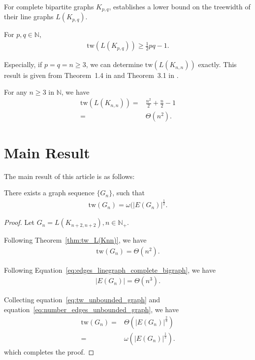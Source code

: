 \documentclass{article}
\newcommand{\edgesg}[1]{E(#1)}
\newcommand{\completebig}[2]{K_{#1,#2}}
\newcommand{\treewidth}{\mathrm{tw}}
\begin{document}
For complete bipartite graphs $\completebig{p}{q}$, \cite{HarveyWood2018} establishes a lower bound on the treewidth of their line graphs $L(\completebig{p}{q})$.

\begin{theorem}\label{thm:tw_lower_bound_of_L(Kpq)}
    For $p,q \in \mathbb{N}$, 
    \begin{align*}
        \mathrm{tw}(L(\completebig{p}{q})) \geq \frac{1}{2}pq-1.
    \end{align*}
\end{theorem}

Especially, if $p= q = n \geq 3$, we can determine $\mathrm{tw}(L(\completebig{n}{n}))$ exactly. This result is given from  Theorem~1.4 in \cite{harvey2014treewidth} and Theorem~3.1 in \cite{lucena2007achievable}. 

\begin{theorem}[Treewidth of $L(\completebig{n}{n})$]\label{thm:tw_L(Knn)}
For any $n \geq 3$ in $\mathbb{N}$, we have
\begin{align*}
    \treewidth(L(\completebig{n}{n})) =& \frac{n^2}{2} + \frac{n}{2} - 1 \\
    =& \Theta(n^2).
\end{align*}
\end{theorem}

\section{Main Result}
The main result of this article is as follows:
\begin{proposition}\label{pro:unbounded_graphs}
    There exists a graph sequence $\{G_n\}$, such that
    \begin{align*}
        \treewidth(G_n) = \omega(|\edgesg{G_n}|^{\frac{1}{2}}.
    \end{align*}
\end{proposition}
\begin{proof}
    Let $G_n = L(\completebig{n+2}{n+2}), n \in \mathbb{N}_+$.

    Following Theorem~\ref{thm:tw_L(Knn)}, we have
    \begin{align}\label{eq:tw_unbounded_graph}
        \treewidth(G_n) = \Theta(n^2).
    \end{align}

    Following Equation~\eqref{eq:edges_linegraph_complete_bigraph}, we have
    \begin{align}\label{eq:number_edges_unbounded_graph}
        |\edgesg{G_n}| = \Theta(n^3).
    \end{align}

    Collecting equation~\eqref{eq:tw_unbounded_graph} and equation~\eqref{eq:number_edges_unbounded_graph}, we have
    \begin{align*}
        \treewidth(G_n) =& \Theta({|\edgesg{G_n}|^\frac{2}{3}})\\
        =& \omega({|\edgesg{G_n}|^\frac{1}{2}}).
    \end{align*}
    which completes the proof.
\end{proof}
\end{document}
